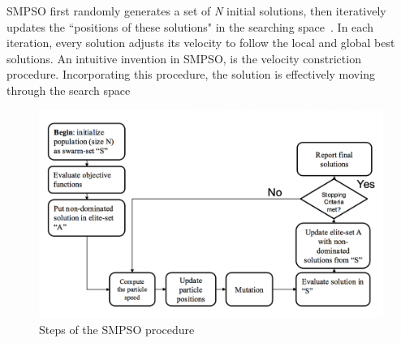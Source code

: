 \documentclass[10pt,journal,compsoc]{IEEEtran}
\begin{document}
SMPSO first randomly generates a set of \textit{N} initial solutions, then iteratively updates the ``positions of these solutions" in the searching space~\cite{smpso}.
In each iteration, every solution adjusts its velocity to follow the local and global best solutions. An intuitive invention in SMPSO, is the velocity constriction procedure. Incorporating this procedure, the solution is effectively moving through the search space \cite{smpso} 

\begin{figure}[ht]
\centerline{\includegraphics[width=\columnwidth]{psophaseflowchart.png}}
\caption{Steps of the SMPSO procedure} 
\label{smpsoflow}
\end{figure}
\end{document}
